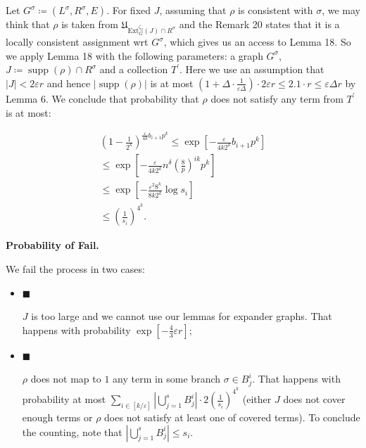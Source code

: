 Let $G^{\sigma}\coloneqq(L^{\sigma},R^{\sigma},E)$. For fixed $J$, assuming that $\rho$ is consistent
with $\sigma$, we may think that $\rho$ is taken from
$\mathfrak{U}_{\mathrm{Ext}_{G}^{\zeta_{2}}\left(J\right)\cap R^{\sigma}}$ and the Remark 20 states that it is a
locally consistent assignment wrt $G^{\sigma}$, which gives us an access to Lemma
18. So we apply Lemma 18 with the following parameters: a
graph $G^{\sigma}$, $J\coloneqq\operatorname*{supp}(\rho)\cap R^{\sigma}$ and a collection $T^{\prime}$. Here we use an
assumption that $|J|<2\varepsilon r$ and hence $|\operatorname*{supp}(\rho)|$ is at most $\left(1+\Delta\cdot\frac{1}{\varepsilon\Delta}\right)\cdot 2\varepsilon r\leq 2%
.1\cdot r\leq\varepsilon\Delta r$ by Lemma 6. We conclude that probability that $\rho$ does not satisfy any
term from $T^{\prime}$ is at most:\par


\[\begin{gathered}
\displaystyle\left(1-\frac{1}{2^{k}}\right)^{\frac{\varepsilon}{4k}b_{i+1}p^{k}} \displaystyle\leq\exp\left[-\frac{\varepsilon}{4k2^{k}}b_{i+1}p^{k}\right] \\
\displaystyle\leq\exp\left[-\frac{\varepsilon}{4k2^{k}}n^{\delta}\left(\frac{8%
}{p}\right)^{ik}p^{k}\right] \\
\displaystyle\leq\exp\left[-\frac{\varepsilon^{2}8^{k}}{8k2^{k}}\log s_{i}\right] \\
\displaystyle\leq\left(\frac{1}{s_{i}}\right)^{4^{k}}.
\end{gathered}\]





\par\medskip\noindent\textbf{Probability of Fail.}\par




We fail the process in two cases:\par


\begin{itemize}


\item[] 
$\blacksquare$ 


$J$ is too large and we cannot use our lemmas for expander graphs. That happens with
probability $\exp\left[-\frac{4}{3}\varepsilon r\right]$;\par





\item[] 
$\blacksquare$ 


$\rho$ does not map to $1$ any term in some branch $\sigma\in B^{i}_{j}$. That happens with
probability at most $\sum\limits_{i\in[k/\varepsilon]}|\bigcup\limits_{j=1}^{s}B^{i}_{j}|\cdot 2%
\left(\frac{1}{s_{i}}\right)^{4^{k}}$ (either $J$ does not cover enough terms or $\rho$
does not satisfy at least one of covered terms). To conclude the counting, note that $\left|\bigcup\limits_{j=1}^{s}B^{i}_{j}\right|\leq s_{i}$.\par





\end{itemize}


